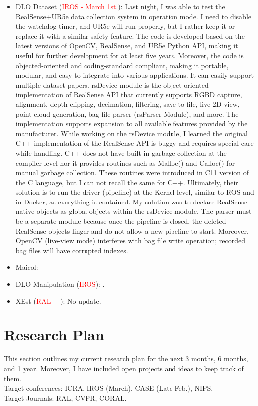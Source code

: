 \documentclass[11pt]{article}
\begin{document}
\begin{itemize}
  \item DLO Dataset (\textcolor{red}{IROS - March 1st.}): Last night, I was able
  to test the RealSense+UR5e data collection system in operation mode. I need to
  disable the watchdog timer, and UR5e will run properly, but I rather keep it or
  replace it with a similar safety feature. The code is developed based on
  the latest versions of OpenCV, RealSense, and UR5e Python API, making it useful
  for further development for at least five years. Moreover, the code
  is objected-oriented and coding-standard compliant, making it portable,
  modular, and easy to integrate into various applications. It can easily support
  multiple dataset papers. rsDevice module is the object-oriented implementation of
  RealSense API that currently supports RGBD capture, alignment, depth clipping,
  decimation, filtering, save-to-file, live 2D view, point cloud generation,
  bag file parser (rsParser Module), and more. The implementation supports
  expansion to all available features provided by the manufacturer. While working
  on the rsDevice module, I learned the original C++ implementation of the
  RealSense API is buggy and requires special care while handling. C++ does not
  have built-in garbage collection at the compiler level nor it provides routines
  such as Malloc() and Calloc() for manual garbage collection. These routines
  were introduced in C11 version of the C language, but I can not recall the same
  for C++. Ultimately, their solution is to run the driver (pipeline) at the
  Kernel level, similar to ROS and in Docker, as everything is contained. My
  solution was to declare RealSense native objects as global objects within the
  rsDevice module. The parser must be a separate module because
  once the pipeline is closed, the deleted RealSense objects linger and do not allow
  a new pipeline to start. Moreover, OpenCV (live-view mode) interferes with
  bag file write operation; recorded bag files will have corrupted indexes.\\
  \item Maicol: \\
  \item DLO Manipulation (\textcolor{red}{IROS}): \cite{abraham2017model}.\\
  \item XEst (\textcolor{red}{RAL ---}): No update.\\
  \end{itemize}

\section{Research Plan}
This section outlines my current research plan for the next 3 months, 6 months,
and 1 year. Moreover, I have included open projects and ideas to keep track of
them.\\
Target conferences: ICRA, IROS (March), CASE (Late Feb.), NIPS.\\
Target Journals: RAL, CVPR, CORAL.\\
\end{document}

